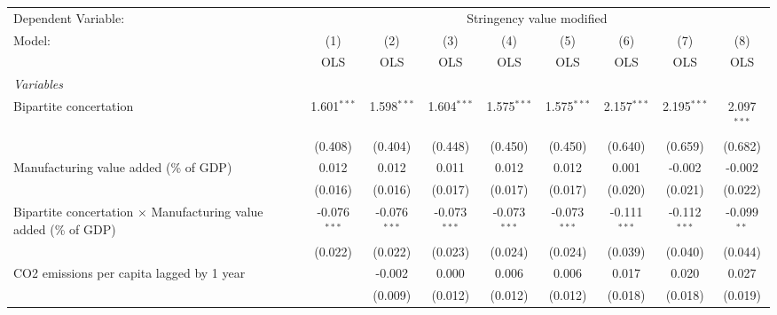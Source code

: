 
\begingroup
\centering
\begin{tabular}{lcccccccc}
   \toprule
   Dependent Variable: & \multicolumn{8}{c}{Stringency value modified}\\
   Model:                                                                  & (1)            & (2)            & (3)            & (4)            & (5)            & (6)            & (7)            & (8)\\  
                                                                           &  OLS           & OLS            & OLS            & OLS            & OLS            & OLS            & OLS            & OLS\\  
   \midrule
   \emph{Variables}\\
   Bipartite concertation                                                  & 1.601$^{***}$  & 1.598$^{***}$  & 1.604$^{***}$  & 1.575$^{***}$  & 1.575$^{***}$  & 2.157$^{***}$  & 2.195$^{***}$  & 2.097$^{***}$\\   
                                                                           & (0.408)        & (0.404)        & (0.448)        & (0.450)        & (0.450)        & (0.640)        & (0.659)        & (0.682)\\   
   Manufacturing value added (\% of GDP)                                   & 0.012          & 0.012          & 0.011          & 0.012          & 0.012          & 0.001          & -0.002         & -0.002\\   
                                                                           & (0.016)        & (0.016)        & (0.017)        & (0.017)        & (0.017)        & (0.020)        & (0.021)        & (0.022)\\   
   Bipartite concertation $\times$ Manufacturing value added (\% of GDP)   & -0.076$^{***}$ & -0.076$^{***}$ & -0.073$^{***}$ & -0.073$^{***}$ & -0.073$^{***}$ & -0.111$^{***}$ & -0.112$^{***}$ & -0.099$^{**}$\\   
                                                                           & (0.022)        & (0.022)        & (0.023)        & (0.024)        & (0.024)        & (0.039)        & (0.040)        & (0.044)\\   
   CO2 emissions per capita lagged by 1 year                               &                & -0.002         & 0.000          & 0.006          & 0.006          & 0.017          & 0.020          & 0.027\\   
                                                                           &                & (0.009)        & (0.012)        & (0.012)        & (0.012)        & (0.018)        & (0.018)        & (0.019)\\   

\end{tabular}
